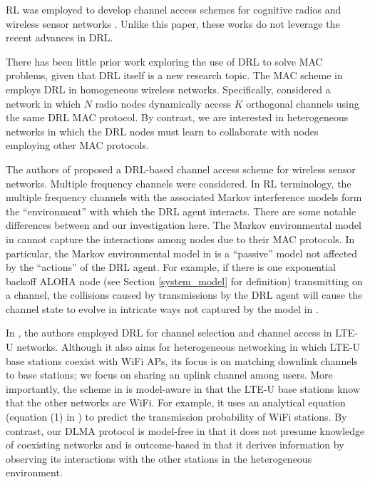 \documentclass[journal,comsoc]{IEEEtran}
\begin{document}
RL was employed to develop channel access schemes for cognitive radios \cite{li2010multiagent,yau2010enhancing,wu2010spectrum,bkassiny2011distributed} and wireless sensor networks \cite{liu2006rl,chu2012aloha}. Unlike this paper, these works do not leverage the recent advances in DRL.

There has been little prior work exploring the use of DRL to solve MAC problems, given that DRL itself is a new research topic. The MAC scheme in \cite{naparstek2017deep} employs DRL in homogeneous wireless networks. Specifically, \cite{naparstek2017deep} considered a network in which $N$  radio nodes dynamically access  $K$ orthogonal channels using the same DRL MAC protocol. By contrast, we are interested in heterogeneous networks in which the DRL nodes must learn to collaborate with nodes employing other MAC protocols.

The authors of \cite{wang2018deep} proposed a DRL-based channel access scheme for wireless sensor networks. Multiple frequency channels were considered. In RL terminology, the multiple frequency channels with the associated Markov interference models form the ``environment'' with which the DRL agent interacts. There are some notable differences between \cite{wang2018deep} and our investigation here. The Markov environmental model in \cite{wang2018deep} cannot capture the interactions among nodes due to their MAC protocols. In particular, the Markov environmental model in \cite{wang2018deep} is a ``passive'' model not affected by the ``actions'' of the DRL agent. For example, if there is one exponential backoff ALOHA node (see Section \ref{system_model} for definition) transmitting on a channel, the collisions caused by transmissions by the DRL agent will cause the channel state to evolve in intricate ways not captured by the model in \cite{wang2018deep}.

In \cite{challita2017deep}, the authors employed DRL for channel selection and channel access in LTE-U networks. Although it also aims for heterogeneous networking in which LTE-U base stations coexist with WiFi APs, its focus is on matching downlink channels to base stations; we focus on sharing an uplink channel among users. More importantly, the scheme in \cite{challita2017deep} is model-aware in that the LTE-U base stations know that the other networks are WiFi. For example, it uses an analytical equation (equation (1) in \cite{challita2017deep}) to predict the transmission probability of WiFi stations. By contrast, our DLMA protocol is model-free in that it does not presume knowledge of coexisting networks and is outcome-based in that it derives information by observing its interactions with the other stations in the heterogeneous environment.
\end{document}
